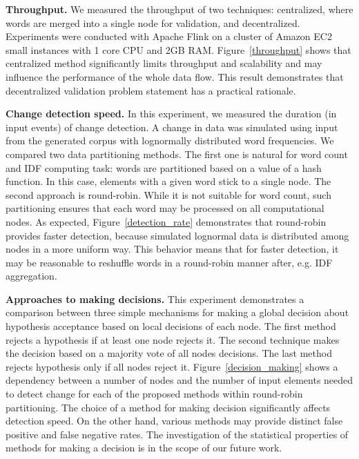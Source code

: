 {\bf Throughput.} We measured the throughput of two techniques: centralized, where words are merged into a single node for validation, and decentralized. Experiments were conducted with Apache Flink on a cluster of Amazon EC2 small instances with 1 core CPU and 2GB RAM. Figure~\ref{throughput} shows that centralized method significantly limits throughput and scalability and may influence the performance of the whole data flow. This result demonstrates that decentralized validation problem statement has a practical rationale.

{\bf Change detection speed.} In this experiment, we measured the duration (in input events) of change detection. A change in data was simulated using input from the generated corpus with lognormally distributed word frequencies. We compared two data partitioning methods. The first one is natural for word count and IDF computing task: words are partitioned based on a value of a hash function. In this case, elements with a given word stick to a single node. The second approach is round-robin. While it is not suitable for word count, such partitioning ensures that each word may be processed on all computational nodes. As expected, Figure~\ref{detection_rate} demonstrates that round-robin provides faster detection, because simulated lognormal data is distributed among nodes in a more uniform way. This behavior means that for faster detection, it may be reasonable to reshuffle words in a round-robin manner after, e.g. IDF aggregation.

{\bf Approaches to making decisions.} This experiment demonstrates a comparison between three simple mechanisms for making a global decision about hypothesis acceptance based on local decisions of each node. The first method rejects a hypothesis if at least one node rejects it. The second technique makes the decision based on a majority vote of all nodes decisions. The last method rejects hypothesis only if all nodes reject it. Figure~\ref{decision_making} shows a dependency between a number of nodes and the number of input elements needed to detect change for each of the proposed methods within round-robin partitioning. The choice of a method for making decision significantly affects detection speed. On the other hand, various methods may provide distinct false positive and false negative rates. The investigation of the statistical properties of methods for making a decision is in the scope of our future work.